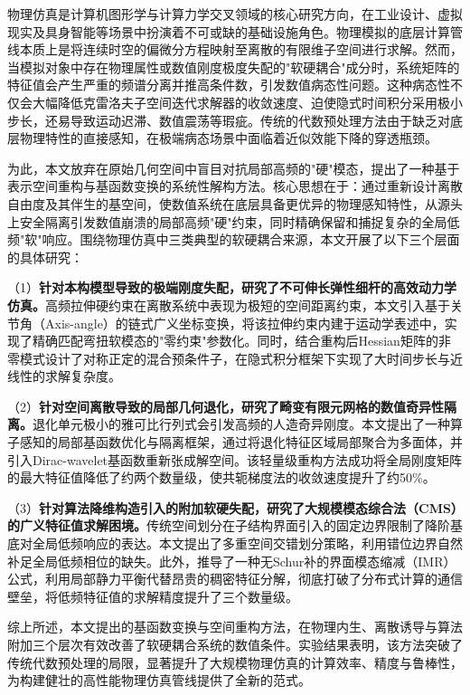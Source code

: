 \cleardoublepage
{}

物理仿真是计算机图形学与计算力学交叉领域的核心研究方向，在工业设计、虚拟现实及具身智能等场景中扮演着不可或缺的基础设施角色。物理模拟的底层计算管线本质上是将连续时空的偏微分方程映射至离散的有限维子空间进行求解。然而，当模拟对象中存在物理属性或数值刚度极度失配的"软硬耦合"成分时，系统矩阵的特征值会产生严重的频谱分离并推高条件数，引发数值病态性问题。这种病态性不仅会大幅降低克雷洛夫子空间迭代求解器的收敛速度、迫使隐式时间积分采用极小步长，还易导致运动迟滞、数值震荡等瑕疵。传统的代数预处理方法由于缺乏对底层物理特性的直接感知，在极端病态场景中面临着近似效能下降的穿透瓶颈。

为此，本文放弃在原始几何空间中盲目对抗局部高频的"硬"模态，提出了一种基于表示空间重构与基函数变换的系统性解构方法。核心思想在于：通过重新设计离散自由度及其伴生的基空间，使数值系统在底层具备更优异的物理感知特性，从源头上安全隔离引发数值崩溃的局部高频"硬"约束，同时精确保留和捕捉复杂的全局低频"软"响应。围绕物理仿真中三类典型的软硬耦合来源，本文开展了以下三个层面的具体研究：

（1）\textbf{针对本构模型导致的极端刚度失配，研究了不可伸长弹性细杆的高效动力学仿真。}高频拉伸硬约束在离散系统中表现为极短的空间距离约束，本文引入基于关节角（Axis-angle）的链式广义坐标变换，将该拉伸约束内建于运动学表述中，实现了精确匹配弯扭软模态的"零约束"参数化。同时，结合重构后Hessian矩阵的非零模式设计了对称正定的混合预条件子，在隐式积分框架下实现了大时间步长与近线性的求解复杂度。

（2）\textbf{针对空间离散导致的局部几何退化，研究了畸变有限元网格的数值奇异性隔离。}退化单元极小的雅可比行列式会引发高频的人造奇异刚度。本文提出了一种算子感知的局部基函数优化与隔离框架，通过将退化特征区域局部聚合为多面体，并引入Dirac-wavelet基函数重新张成解空间。该轻量级重构方法成功将全局刚度矩阵的最大特征值降低了约两个数量级，使共轭梯度法的收敛速度提升了约50\%。

（3）\textbf{针对算法降维构造引入的附加软硬失配，研究了大规模模态综合法（CMS）的广义特征值求解困境。}传统空间划分在子结构界面引入的固定边界限制了降阶基底对全局低频响应的表达。本文提出了多重空间交错划分策略，利用错位边界自然补足全局低频相位的缺失。此外，推导了一种无Schur补的界面模态缩减（IMR）公式，利用局部静力平衡代替昂贵的稠密特征分解，彻底打破了分布式计算的通信壁垒，将低频特征值的求解精度提升了三个数量级。

综上所述，本文提出的基函数变换与空间重构方法，在物理内生、离散诱导与算法附加三个层次有效改善了软硬耦合系统的数值条件。实验结果表明，该方法突破了传统代数预处理的局限，显著提升了大规模物理仿真的计算效率、精度与鲁棒性，为构建健壮的高性能物理仿真管线提供了全新的范式。

